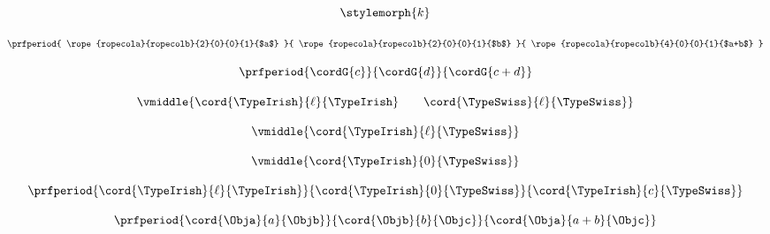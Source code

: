 \begin{forslides}
        \begin{equation}
            \label{eq:semicats-slides-52}
            \stylemorph{k}
        \end{equation}
        
        \begin{equation}
            \label{eq:semicats-slides-53}
                \prfperiod{
        \rope{ropecola}{ropecolb}{2}{0}{0}{1}{$a$}
    }{
        \rope{ropecola}{ropecolb}{2}{0}{0}{1}{$b$}
    }{
        \rope{ropecola}{ropecolb}{4}{0}{0}{1}{$a+b$}
    }
        \end{equation}
        
        \begin{equation}
            \label{eq:semicats-slides-54}
    \prfperiod{
        \cordG{c}
    }{
        \cordG{d}
    }{
        \cordG{c+d}
    }
        \end{equation}
        
         \begin{equation}
            \label{eq:semicats-slides-55}
            \vmiddle{\cord{\TypeIrish}{\ell}{\TypeIrish} \qquad \cord{\TypeSwiss}{\ell}{\TypeSwiss}}
        \end{equation}
        
         \begin{equation}
            \label{eq:semicats-slides-56}
            \vmiddle{\cord{\TypeIrish}{\ell}{\TypeSwiss}}
        \end{equation}
        
         \begin{equation}
            \label{eq:semicats-slides-57}
            \vmiddle{\cord{\TypeIrish}{0}{\TypeSwiss}}
        \end{equation}
        
         \begin{equation}
            \label{eq:semicats-slides-58}
            \prfperiod{
        \cord{\TypeIrish}{\ell}{\TypeIrish}
    }{
        \cord{\TypeIrish}{0}{\TypeSwiss}
    }{
        \cord{\TypeIrish}{c}{\TypeSwiss}
    }
        \end{equation}
        
         \begin{equation}
            \label{eq:semicats-slides-59}
            \prfperiod{
        \cord{\Obja}{a}{\Objb}
    }{
        \cord{\Objb}{b}{\Objc}
    }{
        \cord{\Obja}{a+b}{\Objc}
    }
        \end{equation}
        

\end{forslides}
